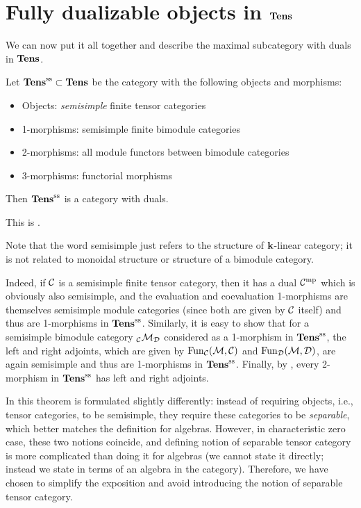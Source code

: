 \section{Fully dualizable objects in $\mathbf{Tens}$}\label{s:tens-dualizable}
We can now put it all together and describe the maximal subcategory with duals
in $\mathbf{Tens}$.

\begin{theorem}\label{t:tens-dualizable}
  Let $\mathbf{Tens}^{\mathrm{ss}}\subset \mathbf{Tens}$ be the category with the following objects and
  morphisms:
  \begin{itemize}
    \item Objects: \emph{semisimple} finite tensor categories
    \item 1-morphisms: semisimple finite bimodule categories
    \item 2-morphisms: all module functors between bimodule categories
    \item 3-morphisms: functorial morphisms
  \end{itemize}
  Then $\mathbf{Tens}^{\mathrm{ss}}$ is a category with duals.
\end{theorem}
This is \cite[Proposition 3.4.3]{dsps-dualizable}.

Note that the word semisimple just refers to the structure of $\mathbf{k}$-linear
category; it is not related to monoidal structure or structure of a bimodule
category.

Indeed, if $\mathcal{C}$ is a semisimple finite tensor category, then it has a dual
$\mathcal{C}^{\mathrm{mp}}$ which is obviously also semisimple, and the evaluation and
coevaluation 1-morphisms are themselves semisimple module categories (since both
are given by $\mathcal{C}$ itself) and thus are 1-morphisms in $\mathbf{Tens}^{\mathrm{ss}}$.
Similarly, it is easy to show that for a semisimple bimodule category
${}_{\mathcal{C}}\mathcal{M}_{\mathcal{D}}$ considered as a 1-morphism in $\mathbf{Tens}^{\mathrm{ss}}$, the left and
right adjoints, which are given by $\operatorname{Fun}_{\mathcal{C}}(\mathcal{M}, \mathcal{C})$ and
$\operatorname{Fun}_{\mathcal{D}}(\mathcal{M}, \mathcal{D})$, are again semisimple and thus are 1-morphisms in
$\mathbf{Tens}^{\mathrm{ss}}$. Finally, by , every 2-morphism in
$\mathbf{Tens}^{\mathrm{ss}}$ has left and right adjoints.


\begin{remark}
  In \cite{dsps-dualizable} this theorem is formulated slightly differently:
  instead of requiring objects, i.e., tensor categories, to be semisimple, they
  require these categories to be \emph{separable}, which better matches the definition for algebras.
  However, in characteristic zero case, these two notions coincide, and defining
  notion of separable tensor category is more complicated than doing it for
  algebras (we cannot state it directly; instead we state in terms of an algebra
  in the category). Therefore, we have chosen to simplify the exposition and
  avoid introducing the notion of separable tensor category.
\end{remark}

